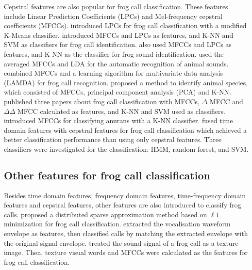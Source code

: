 Cepstral features are also popular for frog call classification. These features include Linear Prediction Coefficients (LPCs) and Mel-frequency cepstral coefficients (MFCCs). 
\cite{colombia2009frogs} introduced LPCs for frog call classification with a modified K-Means classifier. \cite{jaafarcomparative} introduced MFCCs and LPCs as features, and K-NN and SVM as classifiers for frog call identification. \cite{yuan2012frog} also used MFCCs and LPCs as features, and K-NN as the classifier for frog sound identification.
\cite{lee2006automatic} used the averaged MFCCs and LDA for the automatic recognition of animal sounds. \cite{bedoya2014automatic} combined MFCCs and a learning algorithm for multivariate data analysis (LAMDA) for frog call recognition. \cite{vaca2010using} proposed a method to identify animal species, which consisted of MFCCs, principal component analysis (PCA) and K-NN. \cite{jaafar2013, jaafar2013mfcc, tanintelligent2014} published three papers about frog call classification with MFCCs, $\Delta$ MFCC and $\Delta \Delta$ MFCC calculated as features, and K-NN and SVM used as classifiers. \cite{feature2012Colona} introduced MFCCs for classifying anurans with a K-NN classifier. \cite{Noda2016100} fused time domain features with cepstral features for frog call classification which achieved a better classification performance than using only cepstral features. Three classifiers were investigated for the classification: HMM, random forest, and SVM.


\subsection{Other features for frog call classification}
Besides time domain features, frequency domain features, time-frequency domain features and cepstral features, other features are also introduced to classify frog calls.
\cite{wei2012distributed} proposed a distributed sparse approximation method based on $\ell 1$ minimization for frog call classification.  \cite{dang2008lightweight} extracted the vocalisation waveform envelope as features, then classified calls by matching the extracted envelope with the original signal envelope. \cite{kular2015classifying} treated the sound signal of a frog call as a texture image. Then, texture visual words and MFCCs were calculated as the features for frog call classification. 





